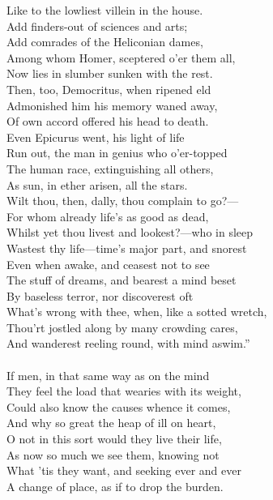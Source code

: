 Like to the lowliest villein in the house.\\
Add finders-out of sciences and arts;\\
Add comrades of the Heliconian dames,\\
Among whom Homer, sceptered o'er them all,\\
Now lies in slumber sunken with the rest.\\
Then, too, Democritus, when ripened eld\\
Admonished him his memory waned away,\\
Of own accord offered his head to death.\\
Even Epicurus went, his light of life\\
Run out, the man in genius who o'er-topped\\
The human race, extinguishing all others,\\
As sun, in ether arisen, all the stars.\\
Wilt thou, then, dally, thou complain to go?—\\
For whom already life's as good as dead,\\
Whilst yet thou livest and lookest?—who in sleep\\
Wastest thy life—time's major part, and snorest\\
Even when awake, and ceasest not to see\\
The stuff of dreams, and bearest a mind beset\\
By baseless terror, nor discoverest oft\\
What's wrong with thee, when, like a sotted wretch,\\
Thou'rt jostled along by many crowding cares,\\
And wanderest reeling round, with mind aswim.''\\
\\
If men, in that same way as on the mind\\
They feel the load that wearies with its weight,\\
Could also know the causes whence it comes,\\
And why so great the heap of ill on heart,\\
O not in this sort would they live their life,\\
As now so much we see them, knowing not\\
What 'tis they want, and seeking ever and ever\\
A change of place, as if to drop the burden.\\
